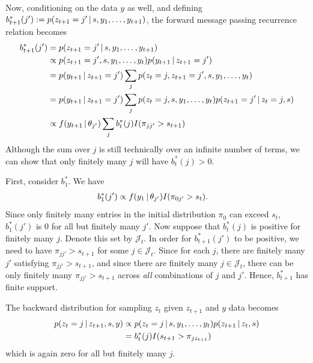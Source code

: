Now, conditioning on the data $y$ as well, and defining
$b^*_{t+1}(j') := p(z_{t+1} = j' \, \vert \, s, y_1, \dots, y_{t+1})$, 
the forward message passing recurrence relation becomes
\begin{align}
  b^*_{t+1}(j') &= p(z_{t+1} = j' \, \vert \, s, y_1, \dots, y_{t+1})\\
  &\propto p(z_{t+1} = j', s, y_1, \dots, y_{t}) p(y_{t+1} \, \vert \, z_{t+1} = j') \\
  &= p(y_{t+1} \, \vert \, z_{t+1} = j') \sum_{j} p(z_{t} = j, z_{t+1} = j', s, y_1, \dots, y_{t}) \\
  &= p(y_{t+1} \, \vert \, z_{t+1} = j') \sum_{j} p(z_{t} = j, s, y_1, \dots, y_{t})
  p(z_{t+1}  = j' \, \vert \, z_{t} = j, s) \\
  &\propto f(y_{t+1} \, \vert \, \theta_{j'}) \sum_{j} b^*_{t}(j) I(\pi_{jj'} > s_{t+1}) 
\end{align}
Although the sum over $j$ is still technically over an infinite number
of terms, we can show that only finitely many $j$ will have
$b^*_{t}(j) > 0$.

First, consider $b^*_1$.  We have
\begin{align}
  b^*_1(j') &\propto f(y_{1} \, \vert \, \theta_{j'}) I(\pi_{0j'} > s_t) .
\end{align}
Since only finitely many entries in the initial distribution $\pi_0$
can exceed $s_t$, $b^*_1(j')$ is 0 for all but finitely many $j'$.
Now suppose that $b^*_t(j)$ is positive for finitely many $j$.  Denote
this set by $\mathcal{J}_t$.  In order for $b^*_{t+1}(j')$ to be
positive, we need to have $\pi_{jj'} > s_{t+1}$ for some $j \in
\mathcal{J}_t$.  Since for each $j$, there are finitely many $j'$ satisfying
$\pi_{jj'} > s_{t+1}$, and since there are finitely many $j \in
\mathcal{J}_t$, there can be only finitely many $\pi_{jj'} > s_{t+1}$ across
{\em all} combinations of $j$ and $j'$.  Hence, $b^*_{t+1}$ has finite support.

The backward distribution for sampling $z_{t}$ given $z_{t+1}$ and $y$
data becomes
\begin{align}
  p(z_t = j \, \vert \, z_{t+1}, s, y) &\propto p(z_{t} = j \, \vert \, s, y_1,
  \dots, y_{t}) p(z_{t+1} \, \vert \, z_t, s) \\
  &= b^*_{t}(j) I(s_{t+1} > \pi_{jz_{t+1}})
\end{align}
which is again zero for all but finitely many $j$.

